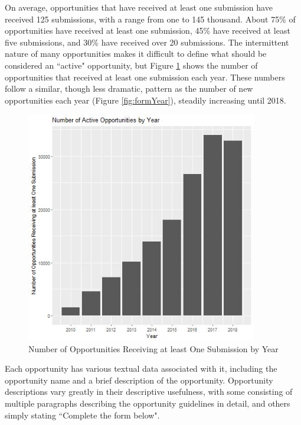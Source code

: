 \documentclass[12pt]{report}   %
\begin{document}
\FloatBarrier
On average, opportunities that have received at least one submission have received 125 submissions, with a range from one to 145 thousand. About 75\% of opportunities have received at least one submission, 45\% have received at least five submissions, and 30\% have received over 20 submissions. The intermittent nature of many opportunities makes it difficult to define what should be considered an ``active" opportunity, but Figure \ref{fig:activeForms} shows the number of opportunities that received at least one submission each year. These numbers follow a similar, though less dramatic, pattern as the number of new opportunities each year (Figure \ref{fig:formYear}), steadily increasing until 2018.

\begin{figure}[h]
    \centering
    \begin{minipage}{0.45\textwidth}
	\captionsetup{font=scriptsize}
        \centering
        \includegraphics[width=0.9\textwidth]{activeForms_plot.jpg} %
        \caption{Number of Opportunities Receiving at least One Submission by Year}
	  \label{fig:activeForms}
    \end{minipage}\hfill
\end{figure}
\FloatBarrier

Each opportunity has various textual data associated with it, including the opportunity name and a brief description of the opportunity. Opportunity descriptions vary greatly in their descriptive usefulness, with some consisting of multiple paragraphs describing the opportunity guidelines in detail, and others simply stating ``Complete the form below". 
\end{document}
